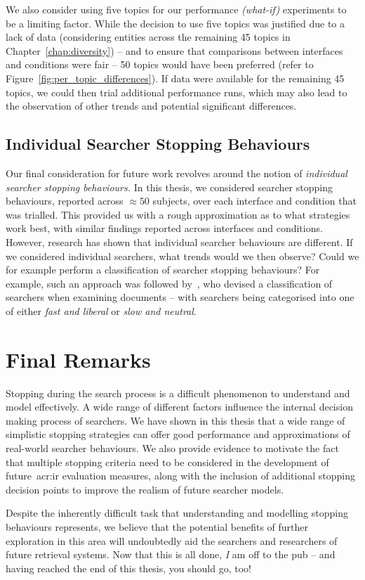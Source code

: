 We also consider using five topics for our performance \emph{(what-if)} experiments to be a limiting factor. While the decision to use five topics was justified due to a lack of data (considering entities across the remaining 45 topics in Chapter~\ref{chap:diversity}) -- and to ensure that comparisons between interfaces and conditions were fair -- 50 topics would have been preferred (refer to Figure~\ref{fig:per_topic_differences}). If data were available for the remaining 45 topics, we could then trial additional performance runs, which may also lead to the observation of other trends and potential significant differences.

\subsection{Individual Searcher Stopping Behaviours}
Our final consideration for future work revolves around the notion of \emph{individual searcher stopping behaviours.} In this thesis, we considered searcher stopping behaviours, reported across $\approx50$ subjects, over each interface and condition that was trialled. This provided us with a rough approximation as to what strategies work best, with similar findings reported across interfaces and conditions. However, research has shown that individual searcher behaviours are different. If we considered individual searchers, what trends would we then observe? Could we for example perform a classification of searcher stopping behaviours? For example, such an approach was followed by~\cite{smucker2011user_strategies}, who devised a classification of searchers when examining documents -- with searchers being categorised into one of either \emph{fast and liberal} or \emph{slow and neutral}.

\section{Final Remarks}\label{sec:conclusions:remarks}
Stopping during the search process is a difficult phenomenon to understand and model effectively. A wide range of different factors influence the internal decision making process of searchers. We have shown in this thesis that a wide range of simplistic stopping strategies can offer good performance and approximations of real-world searcher behaviours. We also provide evidence to motivate the fact that multiple stopping criteria need to be considered in the development of future~\gls{acr:ir} evaluation measures, along with the inclusion of additional stopping decision points to improve the realism of future searcher models.

Despite the inherently difficult task that understanding and modelling stopping behaviours represents, we believe that the potential benefits of further exploration in this area will undoubtedly aid the searchers and researchers of future retrieval systems. Now that this is all done, \emph{I} am off to the pub -- and having reached the end of this thesis, you should go, too!

\newpage
\thispagestyle{empty}
\mbox{}
\newpage
\thispagestyle{empty}
\mbox{}
\newpage